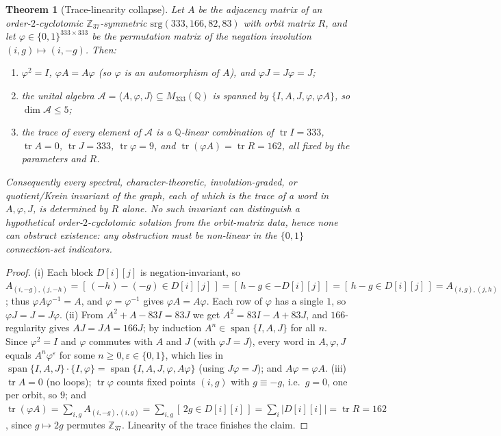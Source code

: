 \documentclass[11pt]{article}
\newtheorem{theorem}{Theorem}
\theoremstyle{definition}
\newcommand{\Z}{\mathbb{Z}}
\newcommand{\Q}{\mathbb{Q}}
\begin{document}
\begin{theorem}[Trace-linearity collapse]\label{thm:collapse}
Let $A$ be the adjacency matrix of an order-$2$-cyclotomic $\Z_{37}$-symmetric $\mathrm{srg}(333,166,82,83)$
with orbit matrix $R$, and let $\varphi\in\{0,1\}^{333\times333}$ be the permutation matrix of the negation
involution $(i,g)\mapsto(i,-g)$. Then:
\begin{enumerate}[label=(\roman*),leftmargin=2.2em]
\item $\varphi^2=I$, $\varphi A=A\varphi$ (so $\varphi$ is an automorphism of $A$), and $\varphi J=J\varphi=J$;
\item the unital algebra $\mathcal A=\langle A,\varphi,J\rangle\subseteq M_{333}(\Q)$ is spanned by
$\{I,A,J,\varphi,\varphi A\}$, so $\dim\mathcal A\le5$;
\item the trace of every element of $\mathcal A$ is a $\Q$-linear combination of
$\operatorname{tr}I=333$, $\operatorname{tr}A=0$, $\operatorname{tr}J=333$, $\operatorname{tr}\varphi=9$,
and $\operatorname{tr}(\varphi A)=\operatorname{tr}R=162$, all fixed by the parameters and $R$.
\end{enumerate}
Consequently every spectral, character-theoretic, involution-graded, or quotient/Krein invariant of the
graph, each of which is the trace of a word in $A,\varphi,J$, is determined by $R$ alone. No such
invariant can distinguish a hypothetical order-$2$-cyclotomic solution from the orbit-matrix data, hence
none can obstruct existence: any obstruction must be \emph{non-linear} in the $\{0,1\}$ connection-set
indicators.
\end{theorem}

\begin{proof}
(i) Each block $D[i][j]$ is negation-invariant, so
$A_{(i,-g),(j,-h)}=[\,(-h)-(-g)\in D[i][j]\,]=[\,h-g\in -D[i][j]\,]=[\,h-g\in D[i][j]\,]=A_{(i,g),(j,h)}$;
thus $\varphi A\varphi^{-1}=A$, and $\varphi=\varphi^{-1}$ gives $\varphi A=A\varphi$. Each row of $\varphi$
has a single $1$, so $\varphi J=J=J\varphi$. (ii) From $A^2+A-83I=83J$ we get $A^2=83I-A+83J$, and
$166$-regularity gives $AJ=JA=166J$; by induction $A^n\in\operatorname{span}\{I,A,J\}$ for all $n$. Since
$\varphi^2=I$ and $\varphi$ commutes with $A$ and $J$ (with $\varphi J=J$), every word in $A,\varphi,J$
equals $A^n\varphi^{\varepsilon}$ for some $n\ge0,\varepsilon\in\{0,1\}$, which lies in
$\operatorname{span}\{I,A,J\}\cdot\{I,\varphi\}=\operatorname{span}\{I,A,J,\varphi,A\varphi\}$ (using
$J\varphi=J$); and $A\varphi=\varphi A$. (iii) $\operatorname{tr}A=0$ (no loops); $\operatorname{tr}\varphi$
counts fixed points $(i,g)$ with $g\equiv-g$, i.e.\ $g=0$, one per orbit, so $9$; and
$\operatorname{tr}(\varphi A)=\sum_{i,g}A_{(i,-g),(i,g)}=\sum_{i,g}[\,2g\in D[i][i]\,]
=\sum_i|D[i][i]|=\operatorname{tr}R=162$, since $g\mapsto2g$ permutes $\Z_{37}$. Linearity of the trace
finishes the claim.
\end{proof}
\end{document}
